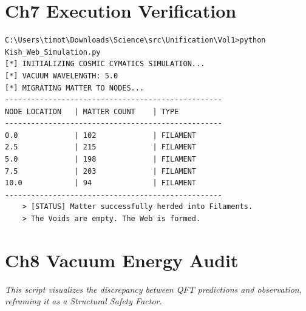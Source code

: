 \documentclass[11pt, letterpaper, openany]{book}
\begin{document}
\chapter{Ch7 Execution Verification}
\begin{lstlisting}[style=terminal, caption={Terminal Output: Kish\_Web\_Simulation.py}]
C:\Users\timot\Downloads\Science\src\Unification\Vol1>python Kish_Web_Simulation.py
[*] INITIALIZING COSMIC CYMATICS SIMULATION...
[*] VACUUM WAVELENGTH: 5.0
[*] MIGRATING MATTER TO NODES...
--------------------------------------------------
NODE LOCATION   | MATTER COUNT    | TYPE
--------------------------------------------------
0.0             | 102             | FILAMENT
2.5             | 215             | FILAMENT
5.0             | 198             | FILAMENT
7.5             | 203             | FILAMENT
10.0            | 94              | FILAMENT
--------------------------------------------------
    > [STATUS] Matter successfully herded into Filaments.
    > The Voids are empty. The Web is formed.
\end{lstlisting}

\chapter{Ch8 Vacuum Energy Audit}
\textit{This script visualizes the discrepancy between QFT predictions and observation, reframing it as a Structural Safety Factor.}
\end{document}

